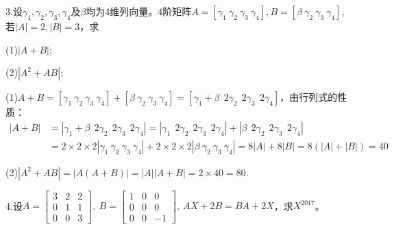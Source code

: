 \documentclass{article}
\begin{document}
3.设$\gamma_{1},\gamma_{2},\gamma_{3},\gamma_{4}$及$\beta$均为4维列向量。4阶矩阵$A=[\gamma_ {1}~\gamma_{2}~\gamma_{3}~\gamma_{4}],B=[\beta~\gamma_{2}~\gamma_{3}~\gamma_{4}]$,若$\left|A\right|=2,\left|B\right|=3$，求

(1)$\left|A+B\right|$;

(2)$\left|A^{2}+AB\right|$;

\begin{jie}
(1)$A+B=[\gamma_ {1}~\gamma_{2}~\gamma_{3}~\gamma_{4}]+[\beta~\gamma_{2}~\gamma_{3}~\gamma_{4}]=[\gamma_{1}+\beta ~~2\gamma_{2}~~2\gamma_{3}~~2\gamma_{4}]$，由行列式的性质：
\begin{align*}
|A+B|&=|\gamma_{1}+\beta ~~2\gamma_{2}~~2\gamma_{3}~~2\gamma_{4}|=|\gamma_{1}~~2\gamma_{2}~~2\gamma_{3}~~2\gamma_{4}|+|\beta ~~2\gamma_{2}~~2\gamma_{3}~~2\gamma_{4}|\\
&=2\times2\times2|\gamma_ {1}~\gamma_{2}~\gamma_{3}~\gamma_{4}|+2\times2\times2|\beta~\gamma_{2}~\gamma_{3}~\gamma_{4}|=8|A|+8|B|=8(|A|+|B|)=40
\end{align*}

(2)$\left|A^{2}+AB\right|=|A(A+B)|=|A||A+B|=2\times 40=80.$
\end{jie}

4.设$
A=
\begin{bmatrix}
  3&2&2 \\
  0&1&1\\
  0&0&3
\end{bmatrix}
,~B=
\begin{bmatrix}
  1&0&0 \\
  0&0&0\\
  0&0&-1
\end{bmatrix}
,~AX+2B=BA+2X$，求$X^{2017}$。
\end{document}
